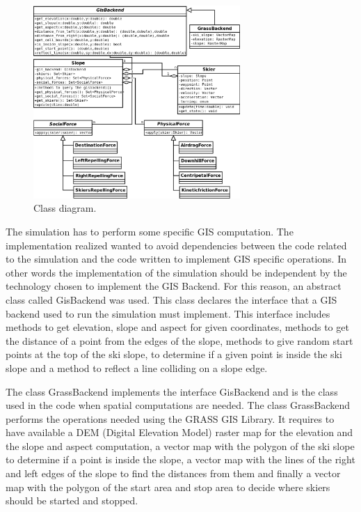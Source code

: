 \documentclass[12pt,a4paper,twoside]{book}
\begin{document}
\begin{figure}
  \begin{center}
    \includegraphics[width=0.7\textwidth]{images/Class_diagram.eps}
    \caption{Class diagram.}\label{class_diagram}
  \end{center}
\end{figure}

The simulation has to perform some specific GIS computation. The implementation realized wanted to avoid dependencies between the code related to the simulation and the code written to implement GIS specific operations. In other words the implementation of the simulation should be independent by the technology chosen to implement the GIS Backend. For this reason, an abstract class called GisBackend was used. This class declares the interface that a GIS backend used to run the simulation must implement. This interface includes methods to get elevation, slope and aspect for given coordinates, methods to get the distance of a point from the edges of the slope, methods to give random start points at the top of the ski slope, to determine if a given point is inside the ski slope and a method to reflect a line colliding on a slope edge.

The class GrassBackend implements the interface GisBackend and is the class used in the code when spatial computations are needed. The class GrassBackend performs the operations needed using the GRASS GIS Library. It requires to have available a DEM (Digital Elevation Model) raster map for the elevation and the slope and aspect computation, a vector map with the polygon of the ski slope to determine if a point is inside the slope, a vector map with the lines of the right and left edges of the slope to find the distances from them and finally a vector map with the polygon of the start area and stop area to decide where skiers should be started and stopped.
\end{document}
